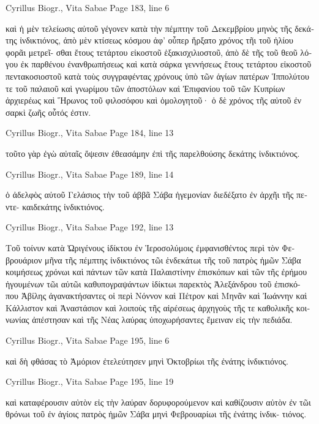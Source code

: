 \documentclass[12pt,letterpaper,twoside,final]{memoir}
\begin{document}
\begin{greek}
Cyrillus Biogr., Vita Sabae 
Page 183, line 6

                    καὶ ἡ μὲν τελείωσις αὐτοῦ γέγονεν κατὰ τὴν 
πέμπτην τοῦ Δεκεμβρίου μηνὸς τῆς δεκάτης ἰνδικτιόνος, ἀπὸ μὲν 
κτίσεως κόσμου ἀφ' οὗπερ ἤρξατο χρόνος τῆι τοῦ ἡλίου φορᾶι μετρεῖ-
σθαι ἔτους τετάρτου εἰκοστοῦ ἑξακισχιλιοστοῦ, ἀπὸ δὲ τῆς τοῦ θεοῦ 
λόγου ἐκ παρθένου ἐνανθρωπήσεως καὶ κατὰ σάρκα γεννήσεως ἔτους 
τετάρτου εἰκοστοῦ πεντακοσιοστοῦ κατὰ τοὺς συγγραφέντας χρόνους 
ὑπὸ τῶν ἁγίων πατέρων Ἱππολύτου τε τοῦ παλαιοῦ καὶ γνωρίμου 
τῶν ἀποστόλων καὶ Ἐπιφανίου τοῦ τῶν Κυπρίων ἀρχιερέως καὶ 
Ἥρωνος τοῦ φιλοσόφου καὶ ὁμολογητοῦ· ὁ δὲ χρόνος τῆς αὐτοῦ 
ἐν σαρκὶ ζωῆς οὗτός ἐστιν. 



Cyrillus Biogr., Vita Sabae 
Page 184, line 13

                           τοῦτο γὰρ ἐγὼ αὐταῖς ὄψεσιν ἐθεασάμην 
ἐπὶ τῆς παρελθούσης δεκάτης ἰνδικτιόνος. 



Cyrillus Biogr., Vita Sabae 
Page 189, line 14

                                                      ὁ ἀδελφὸς αὐτοῦ 
Γελάσιος τὴν τοῦ ἀββᾶ Σάβα ἡγεμονίαν διεδέξατο ἐν ἀρχῆι τῆς πεντε-
καιδεκάτης ἰνδικτιόνος. 



Cyrillus Biogr., Vita Sabae 
Page 192, line 13

Τοῦ τοίνυν κατὰ Ὠριγένους ἰδίκτου ἐν Ἱεροσολύμοις ἐμφανισθέντος 
περὶ τὸν Φεβρουάριον μῆνα τῆς πέμπτης ἰνδικτιόνος τῶι ἑνδεκάτωι 
τῆς τοῦ πατρὸς ἡμῶν Σάβα κοιμήσεως χρόνωι καὶ πάντων τῶν 
κατὰ Παλαιστίνην ἐπισκόπων καὶ τῶν τῆς ἐρήμου ἡγουμένων τῶι 
αὐτῶι καθυπογραψάντων ἰδίκτωι παρεκτὸς Ἀλεξάνδρου τοῦ ἐπισκό-
που Ἀβίλης ἀγανακτήσαντες οἱ περὶ Νόννον καὶ Πέτρον καὶ Μηνᾶν 
καὶ Ἰωάννην καὶ Κάλλιστον καὶ Ἀναστάσιον καὶ λοιποὺς τῆς αἱρέσεως 
ἀρχηγοὺς τῆς τε καθολικῆς κοινωνίας ἀπέστησαν καὶ τῆς Νέας λαύρας 
ὑποχωρήσαντες ἔμειναν εἰς τὴν πεδιάδα. 



Cyrillus Biogr., Vita Sabae 
Page 195, line 6

καὶ δὴ φθάσας τὸ Ἀμόριον ἐτελεύτησεν μηνὶ Ὀκτοβρίωι τῆς ἐνάτης 
ἰνδικτιόνος. 



Cyrillus Biogr., Vita Sabae 
Page 195, line 19

                                              καὶ καταφέρουσιν αὐτὸν 
εἰς τὴν λαύραν δορυφορούμενον καὶ καθίζουσιν αὐτὸν ἐν τῶι θρόνωι 
τοῦ ἐν ἁγίοις πατρὸς ἡμῶν Σάβα μηνὶ Φεβρουαρίωι τῆς ἐνάτης ἰνδικ-
τιόνος. 




\end{greek}
\end{document}
